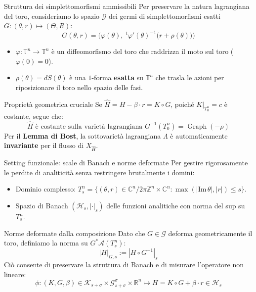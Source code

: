 \documentclass[10pt,aspectratio=169]{beamer}
\newcommand{\T}{\mathbb{T}}
\newcommand{\R}{\mathbb{R}}
\newcommand{\C}{\mathbb{C}}
\newcommand{\Z}{\mathbb{Z}}
\newcommand{\blu}[1]{\textcolor{UniBlue}{\textbf{#1}}}
\begin{document}
\begin{frame}{Struttura dei simplettomorfismi ammissibili}
  Per preservare la natura lagrangiana del toro, consideriamo lo spazio $\mathcal{G}$ dei germi di simplettomorfismi esatti $G: (\theta, r) \mapsto (\Theta, R)$:
  \[
    G(\theta, r) = \Big(\varphi(\theta), \; {}^t\varphi'(\theta)^{-1}\big(r + \rho(\theta)\big)\Big)
  \]
  \begin{itemize}
    \item $\varphi : \T^n \to \T^n$ è un diffeomorfismo del toro che raddrizza il moto sul toro ($\varphi(0) = 0$).
    \item $\rho(\theta) = dS(\theta)$ è una $1$-forma \textbf{esatta} su $\T^n$ che trasla le azioni per riposizionare il toro nello spazio delle fasi.
  \end{itemize}
  \pause
  \begin{block}{Proprietà geometrica cruciale}
    Se $\widehat{H} = H - \beta \cdot r = K \circ G$, poiché $K|_{T_0^n} = c$ è costante, segue che:
    \[
      \widehat{H} \text{ è costante sulla varietà lagrangiana } G^{-1}(T_0^n) = \operatorname{Graph}(-\rho)
    \]
    Per il \textbf{Lemma di Bost}, la sottovarietà lagrangiana $\Lambda$ è automaticamente \blu{invariante} per il flusso di $X_{\widehat{H}}$.
  \end{block}
\end{frame}

\begin{frame}{Setting funzionale: scale di Banach e norme deformate}
  Per gestire rigorosamente le perdite di analiticità senza restringere brutalmente i domini:
  \begin{itemize}
    \item Dominio complesso: $T^n_s = \{(\theta, r) \in \C^n/2\pi\Z^n \times \C^n : \max(|\mathrm{Im}\,\theta|, |r|) \le s\}$.
    \item Spazio di Banach $(\mathcal{H}_s, |\cdot|_s)$ delle funzioni analitiche con norma del sup su $T^n_s$.
  \end{itemize}
  \pause
  \begin{block}{Norme deformate dalla composizione}
    Dato che $G \in \mathcal{G}$ deforma geometricamente il toro, definiamo la norma su $G^*\mathcal{A}(T^n_s)$:
    \[
      |H|_{G, s} := |H \circ G^{-1}|_s
    \]
    Ciò consente di preservare la struttura di Banach e di misurare l'operatore non lineare:
    \[
      \phi : (K, G, \beta) \in \mathcal{K}_{s+\sigma} \times \mathcal{G}_{s+\sigma}^\sigma \times \R^n \longmapsto H = K \circ G + \beta \cdot r \in \mathcal{H}_s
    \]
  \end{block}
\end{frame}
\end{document}
